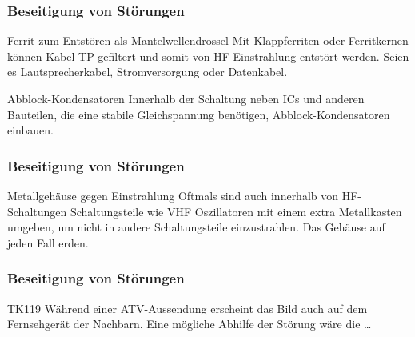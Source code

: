 \begin{frame}
  \frametitle{Beseitigung von Störungen}
  \begin{center}
    \begin{block}{Ferrit zum Entstören als Mantelwellendrossel}
      Mit Klappferriten oder Ferritkernen können Kabel TP-gefiltert und somit von HF-Einstrahlung entstört werden. Seien es Lautsprecherkabel, Stromversorgung oder Datenkabel.
    \end{block}
    \begin{block}{Abblock-Kondensatoren}
      Innerhalb der Schaltung neben ICs und anderen Bauteilen, die eine stabile Gleichspannung benötigen, Abblock-Kondensatoren einbauen.
    \end{block}
  \end{center}
\end{frame}

\begin{frame}
  \frametitle{Beseitigung von Störungen}
  \begin{center}
    \begin{block}{Metallgehäuse gegen Einstrahlung}
      Oftmals sind auch innerhalb von HF-Schaltungen Schaltungsteile wie VHF Oszillatoren mit einem extra Metallkasten umgeben, um nicht in andere Schaltungsteile einzustrahlen. Das Gehäuse auf jeden Fall erden.
    \end{block}
  \end{center}
\end{frame}

\begin{frame}
  \frametitle{Beseitigung von Störungen}
  \begin{center}
    \begin{exampleblock}{TK119}
      Während einer ATV-Aussendung erscheint das Bild auch auf dem Fernsehgerät der Nachbarn. Eine mögliche Abhilfe der Störung wäre die \ldots \\[3em]
    \end{exampleblock}
  \end{center}
\end{frame}

